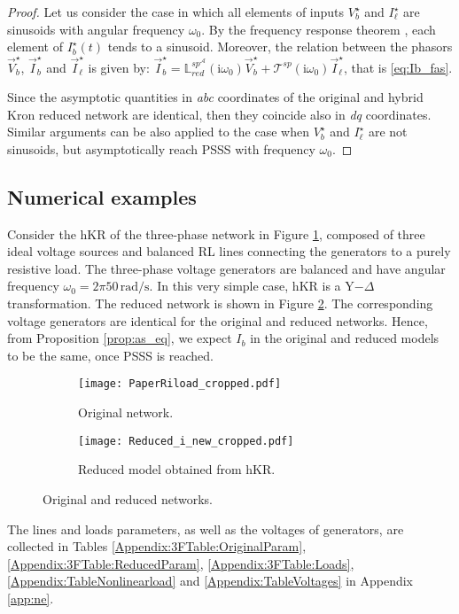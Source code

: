 \documentclass[a4paper]{article}
\theoremstyle{plain}
\def\Lset{\mathbb{L}}
\newcommand{\AAA}{{\mathcal A}}
\newcommand{\T}{{\mathcal T}}
\begin{document}
\begin{proof}
Let us consider the case in which all elements of inputs $V_b^{\star}$ and $I^{\star}_{\ell}$ are sinusoids with angular frequency $\omega_0$. By the frequency response theorem \cite{desoer1984basic}, each element of $I_{b}^{\star}(t)$ tends to a sinusoid. Moreover, the relation between the phasors $\vec{V}_b^{\star}$, $\vec{I}_b^{\star}$ and $\vec{I}_{\ell}^{\star}$ is given by: $\vec{I}_b^{\star}=\Lset_{red}^{sp^{\AAA}}(\mathrm i \omega_0)\vec{V}_b^{\star}+\T^{sp}(\mathrm i \omega_0)\vec{I}_{\ell}^{\star}$, that is \eqref{eq:Ib_fas}.

Since the asymptotic quantities in \emph{abc} coordinates of the original and hybrid Kron reduced network are identical, then they coincide also in \emph{dq} coordinates. Similar arguments can be also applied to the case when $V_b^{\star}$ and $I_{\ell}^{\star}$ are not sinusoids, but asymptotically reach PSSS with frequency $\omega_0$.
\end{proof}


	\subsection{Numerical examples}
\label{subsec:ne}
    Consider the hKR of the three-phase network in Figure \ref{Fig:NetworkOriginal}, composed of three ideal voltage sources and balanced RL lines connecting the generators to a purely resistive load. The three-phase voltage generators are balanced and have angular frequency $\omega_0=2\pi50\,\mbox{rad/s}$. In this very simple case, hKR is a Y$-\Delta$ transformation. The reduced network is shown in Figure \ref{Fig:NetworkReduced}. 
    The corresponding voltage generators are identical for the original and reduced networks. Hence, from Proposition \ref{prop:as_eq}, we expect $I_b$ in the original and reduced models to be the same, once PSSS is reached.
 \begin{figure}
    	\centering
    	\begin{subfigure}[htb]{0.5\textwidth}
    		\centering
    		\texttt{[image: PaperRiload\_cropped.pdf]}
    		\caption{Original network.}
    		\label{Fig:NetworkOriginal}
    	\end{subfigure}
    	\begin{subfigure}[htb]{0.5\textwidth}
    		\centering
    		\vspace{5mm}
    		\texttt{[image: Reduced\_i\_new\_cropped.pdf]}
    		\caption{Reduced model obtained from hKR.}
    		\label{Fig:NetworkReduced}
    	\end{subfigure}
    	\caption{Original and reduced networks.}
    	\label{fig:21nodes_performance}
    \end{figure}
    The lines and loads parameters, as well as the voltages of generators,  are collected in Tables \ref{Appendix:3FTable:OriginalParam}, \ref{Appendix:3FTable:ReducedParam}, \ref{Appendix:3FTable:Loads}, \ref{Appendix:TableNonlinearload} and \ref{Appendix:TableVoltages} in Appendix \ref{app:ne}.
    
\end{document}
